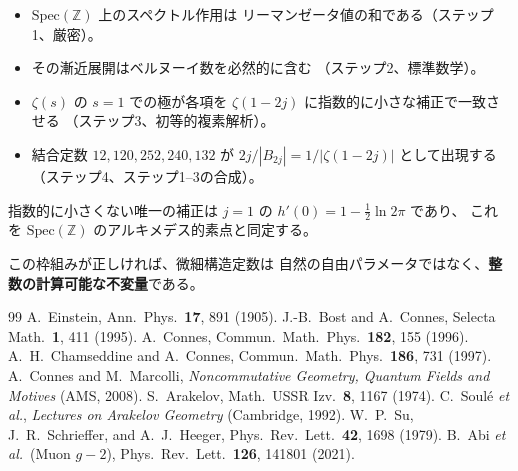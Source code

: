 \documentclass[11pt,a4paper]{article}
\newcommand{\Spec}{\mathrm{Spec}}
\begin{document}
\begin{itemize}
\item $\Spec(\mathbb{Z})$ 上のスペクトル作用は
リーマンゼータ値の和である（ステップ1、厳密）。
\item その漸近展開はベルヌーイ数を必然的に含む
（ステップ2、標準数学）。
\item $\zeta(s)$ の $s=1$ での極が各項を
$\zeta(1{-}2j)$ に指数的に小さな補正で一致させる
（ステップ3、初等的複素解析）。
\item 結合定数 $12, 120, 252, 240, 132$ が
$2j/|B_{2j}|=1/|\zeta(1{-}2j)|$ として出現する
（ステップ4、ステップ1--3の合成）。
\end{itemize}

指数的に小さくない唯一の補正は $j=1$ の
$h'(0)=1-\frac{1}{2}\ln 2\pi$ であり、
これを $\Spec(\mathbb{Z})$ のアルキメデス的素点と同定する。

この枠組みが正しければ、微細構造定数は
自然の自由パラメータではなく、\textbf{整数の計算可能な不変量}である。

\bigskip

\begin{thebibliography}{99}
 A.~Einstein, Ann.\ Phys.\ \textbf{17}, 891 (1905).
 J.-B.~Bost and A.~Connes, Selecta Math.\ \textbf{1}, 411 (1995).
 A.~Connes, Commun.\ Math.\ Phys.\ \textbf{182}, 155 (1996).
 A.~H.~Chamseddine and A.~Connes, Commun.\ Math.\ Phys.\ \textbf{186}, 731 (1997).
 A.~Connes and M.~Marcolli, \textit{Noncommutative Geometry, Quantum Fields and Motives} (AMS, 2008).
 S.~Arakelov, Math.\ USSR Izv.\ \textbf{8}, 1167 (1974).
 C.~Soul\'e \textit{et al.}, \textit{Lectures on Arakelov Geometry} (Cambridge, 1992).
 W.~P.~Su, J.~R.~Schrieffer, and A.~J.~Heeger, Phys.\ Rev.\ Lett.\ \textbf{42}, 1698 (1979).
 B.~Abi \textit{et al.}\ (Muon $g{-}2$), Phys.\ Rev.\ Lett.\ \textbf{126}, 141801 (2021).
\end{thebibliography}
\end{document}

